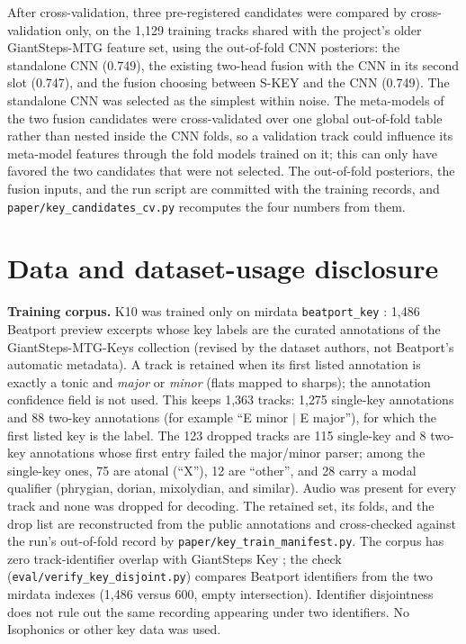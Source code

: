 \documentclass{article}
\begin{document}
After cross-validation, three pre-registered candidates were compared by
cross-validation only, on the 1{,}129 training tracks shared with the project's older
GiantSteps-MTG feature set, using the out-of-fold CNN posteriors: the standalone CNN
(0.749), the existing two-head fusion with the CNN in its second slot (0.747), and the
fusion choosing between S-KEY and the CNN (0.749). The standalone CNN was selected as the
simplest within noise. The meta-models of the two fusion candidates were
cross-validated over one global out-of-fold table rather than nested inside the CNN
folds, so a validation track could influence its meta-model features through the fold
models trained on it; this can only have favored the two candidates that were not
selected. The out-of-fold posteriors, the fusion inputs, and the run script are committed
with the training records, and \texttt{paper/key\_candidates\_cv.py} recomputes the four
numbers from them.

\section{Data and dataset-usage disclosure}
\label{sec:disclosure}

\textbf{Training corpus.} K10 was trained only on mirdata \texttt{beatport\_key}
\cite{faraldo2017thesis}: 1{,}486 Beatport preview excerpts whose key labels are the
curated annotations of the GiantSteps-MTG-Keys collection (revised by the dataset
authors, not Beatport's automatic metadata). A track is retained when its first listed annotation is exactly a tonic and
\emph{major} or \emph{minor} (flats mapped to sharps); the annotation confidence field
is not used. This keeps 1{,}363 tracks: 1{,}275 single-key annotations and 88 two-key
annotations (for example ``E minor $|$ E major''), for which the first listed key is
the label. The 123 dropped tracks are 115 single-key and 8 two-key annotations whose
first entry failed the major/minor parser; among the single-key ones, 75 are atonal
(``X''), 12 are ``other'', and 28 carry a modal qualifier (phrygian, dorian,
mixolydian, and similar). Audio was present for every track and none was dropped for
decoding. The retained set, its folds, and the drop list are reconstructed from
the public annotations and cross-checked against the run's out-of-fold record by
\texttt{paper/key\_train\_manifest.py}. The corpus has zero
track-identifier overlap with GiantSteps Key \cite{knees2015giantsteps}; the check
(\texttt{eval/verify\_key\_disjoint.py}) compares Beatport identifiers from the two
mirdata indexes (1{,}486 versus 600, empty intersection). Identifier disjointness does
not rule out the same recording appearing under two identifiers. No Isophonics or other
key data was used.
\end{document}
